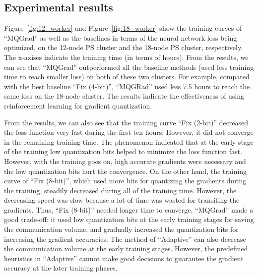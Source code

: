 \documentclass[sigconf]{acmart}
\begin{document}
\subsection{Experimental results}
Figure~\ref{fig:12_worker} and Figure~\ref{fig:18_worker} show the training curves of ``MQGrad'' as well as the baselines in terms of the neural network loss being optimized, on the 12-node PS cluster and the 18-node PS cluster, respectively. The x-axises indicate the training time (in terms of hours). From the results, we can see that ``MQGrad'' outperformed all the baseline methods (used less training time to reach smaller loss) on both of these two clusters. For example, compared with the best baseline ``Fix (4-bit)'', ``MQGRad'' used less 7.5 hours to reach the same loss on the 18-node cluster. The results indicate the effectiveness of using reinforcement learning for gradient quantization.

From the results, we can also see that the training curve ``Fix (2-bit)'' decreased the loss function very fast during the first ten hours. However, it did not converge in the remaining training time. The phenomenon indicated that at the early stage of the training low quantization bits helped to minimize the loss function fast. However, with the training goes on, high accurate gradients were necessary and the low quantization bits hurt the convergence. On the other hand, the training curve of ``Fix (8-bit)'', which used more bits for quantizing the gradients during the training, steadily decreased during all of the training time. However, the decreasing speed was slow because a lot of time was wasted for transiting the gradients. Thus, ``Fix (8-bit)'' needed longer time to converge. ``MQGrad'' made a good trade-off: it used low quantization bits at the early training stages for saving the communication volume, and gradually increased the quantization bits for increasing the gradient accuracies. The method of ``Adaptive'' can also decrease the communication volume at the early training stages. However, the predefined heuristics in ``Adaptive'' cannot make good decisions to guarantee the gradient accuracy at the later training phases.
\end{document}

